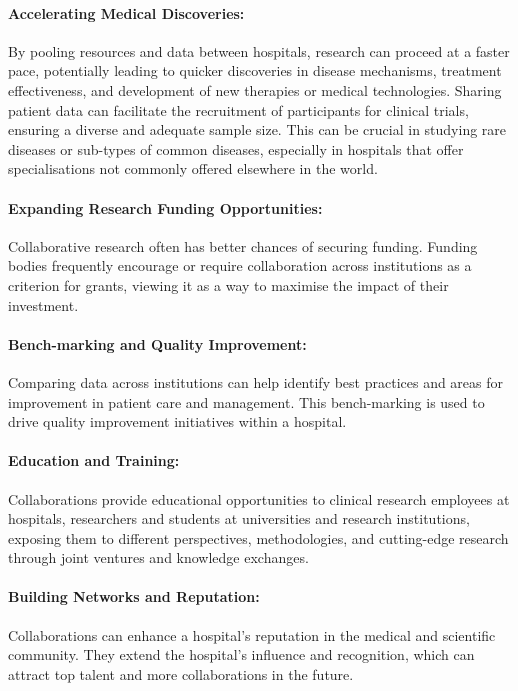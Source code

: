 \documentclass[11pt]{article}
\begin{document}
\paragraph{Accelerating Medical Discoveries:}
By pooling resources and data between hospitals, research can proceed at a faster pace\cite{app11020796}, potentially leading to quicker discoveries in disease mechanisms, treatment effectiveness, and development of new therapies or medical technologies. Sharing patient data can facilitate the recruitment of participants for clinical trials, ensuring a diverse and adequate sample size. This can be crucial in studying rare diseases or sub-types of common diseases, especially in hospitals that offer specialisations not commonly offered elsewhere in the world. 

\paragraph{Expanding Research Funding Opportunities:} Collaborative research often has better chances of securing funding\cite{Vasan2021}. Funding bodies frequently encourage or require collaboration across institutions as a criterion for grants, viewing it as a way to maximise the impact of their investment.

\paragraph{Bench-marking and Quality Improvement:} Comparing data across institutions can help identify best practices and areas for improvement in patient care and management. This bench-marking is used to drive quality improvement initiatives within a hospital\cite{Werner2005}.

\paragraph{Education and Training:} Collaborations provide educational opportunities to clinical research employees at hospitals, researchers and students at universities and research institutions, exposing them to different perspectives, methodologies, and cutting-edge research through joint ventures and knowledge exchanges.

\paragraph{Building Networks and Reputation:} Collaborations can enhance a hospital’s reputation in the medical and scientific community\cite{Vasan2021}. They extend the hospital’s influence and recognition, which can attract top talent and more collaborations in the future.
\end{document}
